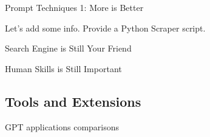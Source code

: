 \documentclass{beamer}
\begin{document}
\begin{frame}{Prompt Techniques 1: More is Better}
\begin{tcolorbox}[title=Improve the basic case,
  subtitle style={} ]
  Let's add some info.
  Provide a Python Scraper script.
      
      
      
    
\end{tcolorbox}
\end{frame}


\begin{frame}{Search Engine is Still Your Friend}
\end{frame}

\begin{frame}{Human Skills is Still Important}
\end{frame}

\subsection{Tools and Extensions}
\begin{frame}{GPT applications comparisons}
  
\end{frame}
\end{document}
